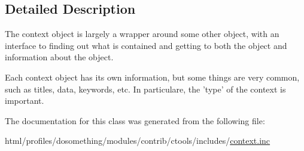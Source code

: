 \subsection{Detailed Description}
The context object is largely a wrapper around some other object, with an interface to finding out what is contained and getting to both the object and information about the object.

Each context object has its own information, but some things are very common, such as titles, data, keywords, etc. In particulare, the 'type' of the context is important. 

The documentation for this class was generated from the following file:\begin{DoxyCompactItemize}
\item 
html/profiles/dosomething/modules/contrib/ctools/includes/\hyperlink{context_8inc}{context.inc}\end{DoxyCompactItemize}
